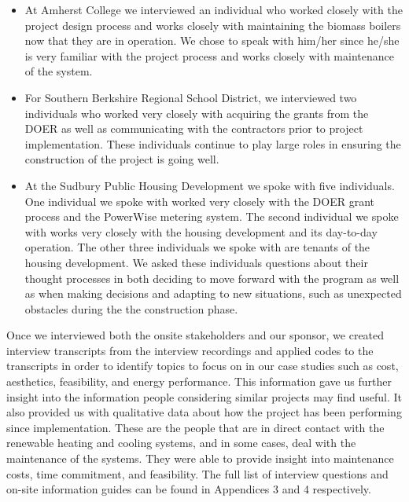     \begin{itemize}
      \item{At Amherst College we interviewed an individual who worked closely with the project design process and works closely with maintaining the biomass boilers now that they are in operation. We chose to speak with him/her since he/she is very familiar with the project process and works closely with maintenance of the system.}
      \item{For Southern Berkshire Regional School District, we interviewed two individuals who worked very closely with acquiring the grants from the DOER as well as communicating with the contractors prior to project implementation. These individuals continue to play large roles in ensuring the construction of the project is going well.}
      \item{At the Sudbury Public Housing Development we spoke with five individuals. One individual we spoke with worked very closely with the DOER grant process and the PowerWise metering system. The second individual we spoke with works very closely with the housing development and its day-to-day operation. The other three individuals we spoke with are tenants of the housing development. We asked these individuals questions about their thought processes in both deciding to move forward with the program as well as when making decisions and adapting to new situations, such as unexpected obstacles during the the construction phase.}
    \end{itemize}
    \par Once we interviewed both the onsite stakeholders and our sponsor, we created interview transcripts from the interview recordings and applied codes to the transcripts in order to identify topics to focus on in our case studies such as cost, aesthetics, feasibility, and energy performance. This information gave us further insight into the information people considering similar projects may find useful. It also provided us with qualitative data about how the project has been performing since implementation. These are the people that are in direct contact with the renewable heating and cooling systems, and in some cases, deal with the maintenance of the systems. They were able to provide insight into maintenance costs, time commitment, and feasibility. The full list of interview questions and on-site information guides can be found in Appendices 3 and 4 respectively. 

